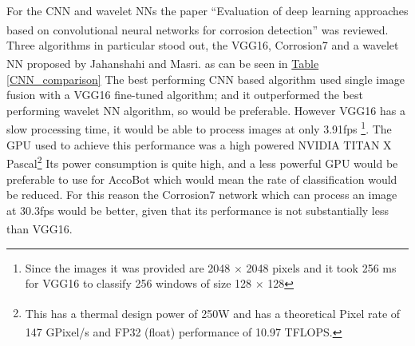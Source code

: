 \documentclass[11pt]{article}		%
\newcommand{\supercite}[1]{\textsuperscript{\cite{#1}}}		%
\newcommand{\tableref}[1]{\hyperref[#1]{Table \ref*{#1}}}     %
\begin{document}
For the CNN and wavelet NNs the paper “Evaluation of deep learning approaches based on convolutional neural networks for corrosion detection”\supercite{Corrosion7}  was reviewed. Three algorithms in particular stood out, the VGG16, Corrosion7 and a wavelet NN proposed by Jahanshahi and Masri\supercite{WNN}. as can be seen in \tableref{CNN_comparison}  The best performing CNN based algorithm used single image fusion with a VGG16 fine-tuned algorithm; and it outperformed the best performing wavelet NN algorithm, so would be preferable. However VGG16 has a slow processing time, it would be able to process images at only 3.91fps \footnote{Since the images it was provided are 2048 $\times$ 2048 pixels and it took 256 ms for VGG16 to classify 256 windows of size 128 $\times$ 128}. The GPU used to achieve this performance was a high powered NVIDIA TITAN X Pascal\footnote{This has a thermal design power of 250W\supercite{Nvidia_Titan} and has a theoretical Pixel rate of 147 GPixel/s and FP32 (float) performance of 10.97 TFLOPS.\supercite{Corrosion7}} Its power consumption is quite high, and a less powerful GPU would be preferable to use for AccoBot which would mean the rate of classification would be reduced. For this reason the Corrosion7 network which can process an image at 30.3fps would be better, given that its performance is not substantially less than VGG16.\supercite{Corrosion7} 
	        \\
	        
\end{document}
